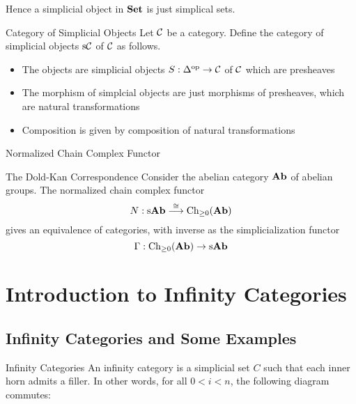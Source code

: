 \documentclass[a4paper]{article}
\begin{document}
Hence a simplicial object in $\bold{Set}$ is just simplical sets. 

\begin{defn}{Category of Simplicial Objects}{} Let $\mathcal{C}$ be a category. Define the category of simplicial objects $\text{s}\mathcal{C}$ of $\mathcal{C}$ as follows. 
\begin{itemize}
\item The objects are simplicial objects $S:\Delta^\text{op}\to\mathcal{C}$ of $\mathcal{C}$ which are presheaves
\item The morphism of simplcial objects are just morphisms of presheaves, which are natural transformations
\item Composition is given by composition of natural transformations
\end{itemize}
\end{defn}

\begin{defn}{Normalized Chain Complex Functor}{} 
\end{defn}

\begin{thm}{The Dold-Kan Correspondence}{} Consider the abelian category $\bold{Ab}$ of abelian groups. The normalized chain complex functor $$N:\text{s}\bold{Ab}\overset{\cong}{\longrightarrow}\text{Ch}_{\geq 0}(\bold{Ab})$$ gives an equivalence of categories, with inverse as the simplicialization functor $$\Gamma:\text{Ch}_{\geq 0}(\bold{Ab})\to\text{s}\bold{Ab}$$
\end{thm}

\pagebreak
\section{Introduction to Infinity Categories}
\subsection{Infinity Categories and Some Examples}
\begin{defn}{Infinity Categories}{} An infinity category is a simplicial set $C$ such that each inner horn admits a filler. In other words, for all $0<i<n$, the following diagram commutes: \\~\\
\\~\\
\end{defn}
\end{document}
